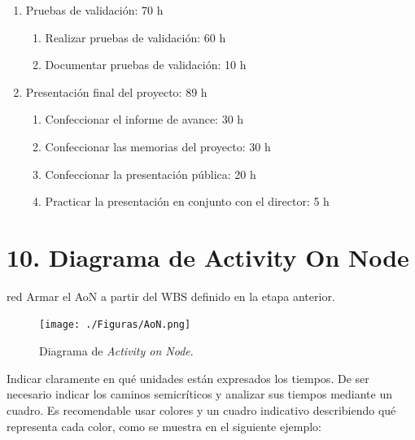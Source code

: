 \documentclass[
11pt, %
]{charter}
\begin{document}
\begin{enumerate}
\begin{enumerate}
    \end{enumerate}
    
\item Pruebas de validación: 70 h
    \begin{enumerate}
    \item Realizar pruebas de validación: 60 h
    \item Documentar pruebas de validación: 10 h
    \end{enumerate}
    
\item Presentación final del proyecto: 89 h
    \begin{enumerate}
    \item Confeccionar el informe de avance: 30 h
    \item Confeccionar las memorias del proyecto: 30 h
    \item Confeccionar la presentación pública: 20 h
    \item Practicar la presentación en conjunto con el director: 5 h
    \end{enumerate}

  
\end{enumerate}


\section{10. Diagrama de Activity On Node}
\label{sec:AoN}

\begin{consigna}{red}
Armar el AoN a partir del WBS definido en la etapa anterior. 



\end{consigna}

\begin{figure}[htpb]
\centering 
\texttt{[image: ./Figuras/AoN.png]}
\caption{Diagrama de \textit{Activity on Node}.}
\label{fig:AoN}
\end{figure}

Indicar claramente en qué unidades están expresados los tiempos.
De ser necesario indicar los caminos semicríticos y analizar sus tiempos mediante un cuadro.
Es recomendable usar colores y un cuadro indicativo describiendo qué representa cada color, como se muestra en el siguiente ejemplo:
\end{document}
